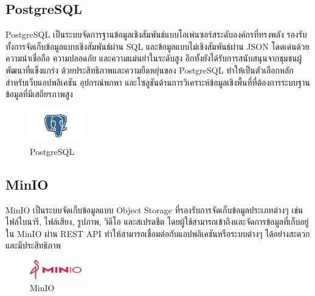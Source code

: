 \newpage

\subsection{PostgreSQL}
PostgreSQL เป็นระบบจัดการฐานข้อมูลเชิงสัมพันธ์แบบโอเพ่นซอร์สระดับองค์กรที่ทรงพลัง รองรับทั้งการจัดเก็บข้อมูลแบบเชิงสัมพันธ์ผ่าน SQL และข้อมูลแบบไม่เชิงสัมพันธ์ผ่าน JSON โดดเด่นด้วยความน่าเชื่อถือ ความปลอดภัย และความแม่นยำในระดับสูง อีกทั้งยังได้รับการสนับสนุนจากชุมชนผู้พัฒนาที่แข็งแกร่ง ด้วยประสิทธิภาพและความยืดหยุ่นของ PostgreSQL ทำให้เป็นตัวเลือกหลักสำหรับเว็บแอปพลิเคชัน อุปกรณ์พกพา และโซลูชันด้านการวิเคราะห์ข้อมูลเชิงพื้นที่ที่ต้องการระบบฐานข้อมูลที่มีเสถียรภาพสูง \cite{aiw6}
\begin{figure}[H]
  \begin{center}
  \includegraphics[width=0.2\textwidth]{PostgreSQL-Logo.wine.png}
  \end{center}
  \caption[PostgreSQL]{PostgreSQL}
\end{figure}
\subsection{MinIO}
MinIO เป็นระบบจัดเก็บข้อมูลแบบ Object Storage ที่รองรับการจัดเก็บข้อมูลประเภทต่างๆ เช่น ไฟล์ไบนารี, ไฟล์เสียง, รูปภาพ, วิดีโอ และสเปรดชีต โดยผู้ใช้สามารถเข้าถึงและจัดการข้อมูลที่เก็บอยู่ใน MinIO ผ่าน REST API ทำให้สามารถเชื่อมต่อกับแอปพลิเคชันหรือระบบต่างๆ ได้อย่างสะดวกและมีประสิทธิภาพ \cite{aiw5}
\begin{figure}[H]
  \begin{center}
  \includegraphics[width=0.2\textwidth]{cdnlogo.com_minio.png}
  \end{center}
  \caption[MinIO]{MinIO}
\end{figure}
